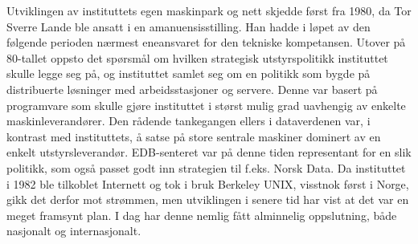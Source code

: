 Utviklingen av instituttets egen maskinpark og nett skjedde først fra 1980, da Tor Sverre Lande ble ansatt i en amanuensisstilling. Han hadde i løpet av den følgende perioden nærmest eneansvaret for den tekniske kompetansen. Utover på 80-tallet oppsto det spørsmål om hvilken strategisk utstyrspolitikk instituttet skulle legge seg på, og instituttet samlet seg om en politikk som bygde på distribuerte løsninger med arbeidsstasjoner og servere. Denne var basert på programvare som skulle gjøre instituttet i størst mulig grad uavhengig av enkelte maskinleverandører. Den rådende tankegangen ellers i dataverdenen var, i kontrast med instituttets, å satse på store sentrale maskiner dominert av en enkelt utstyrsleverandør. EDB-senteret var på denne tiden representant for en slik politikk, som også passet godt inn strategien til f.eks. Norsk Data. Da instituttet i 1982 ble tilkoblet Internett og tok i bruk Berkeley UNIX, visstnok først i Norge, gikk det derfor mot strømmen, men utviklingen i senere tid har vist at det var en meget framsynt plan. I dag har denne nemlig fått alminnelig oppslutning, både nasjonalt og internasjonalt.
